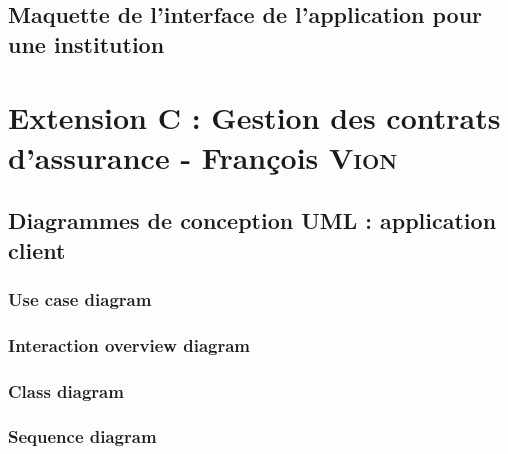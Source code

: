 \documentclass[]{report}
\begin{document}
\newpage

\section{Maquette de l'interface de l'application pour une institution}







\chapter{Extension C : Gestion des contrats d’assurance - François \textsc{Vion}}



\newpage



\section{Diagrammes de conception UML : application client}



\subsection{Use case diagram}



\newpage

\subsection{Interaction overview diagram}



\newpage

\subsection{Class diagram}



\newpage

\subsection{Sequence diagram}


\end{document}
